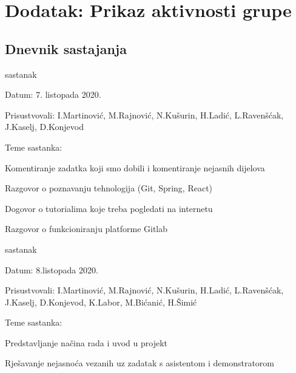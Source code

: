 \chapter*{Dodatak: Prikaz aktivnosti grupe}
		
		\section*{Dnevnik sastajanja}
		
		\begin{packed_enum}
			\item  sastanak
			
			\item[] \begin{packed_item}
				\item Datum:  7. listopada 2020.
				\item Prisustvovali: I.Martinović, M.Rajnović, N.Kušurin, H.Ladić, L.Ravenšćak, J.Kaselj, D.Konjevod
				\item Teme sastanka: 
				\begin{packed_item}
					\item  Komentiranje zadatka koji smo dobili i komentiranje nejasnih dijelova
					\item  Razgovor o poznavanju tehnologija (Git, Spring, React)
					\item  Dogovor o tutorialima koje treba pogledati na internetu
					\item  Razgovor o funkcioniranju platforme Gitlab
				\end{packed_item}
			\end{packed_item}
			
			\item  sastanak
			\item[] \begin{packed_item}
				\item Datum:  8.listopada 2020.
				\item Prisustvovali: I.Martinović, M.Rajnović, N.Kušurin, H.Ladić, L.Ravenšćak, J.Kaselj, D.Konjevod, K.Labor, M.Bićanić, H.Šimić
				\item Teme sastanka:
				\begin{packed_item}
					\item   Predstavljanje načina rada i uvod u projekt
					\item   Rješavanje nejasnoća vezanih uz zadatak s asistentom i demonstratorom
				\end{packed_item}
			\end{packed_item}
		

\end{packed_enum}

